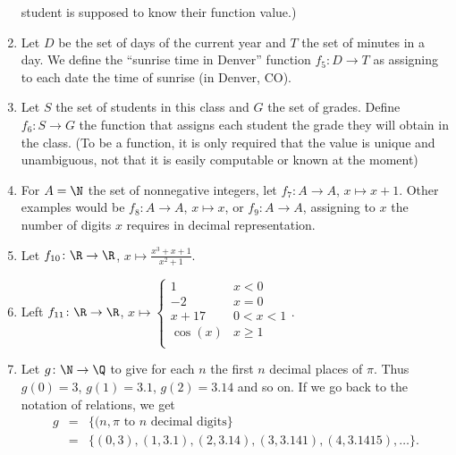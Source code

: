\begin{enumerate}
student is supposed to know their function value.)
\item Let $D$ be the set of days of the current year and $T$ the set of
minutes in a day. We define the ``sunrise time in Denver'' function $f_5\colon
D\to T$ as assigning to each date the time of sunrise (in Denver, CO).
\item Let $S$ the set of students in this class and $G$ the set of grades.
Define $f_6\colon S\to G$ the function that assigns each student the
grade they will obtain in the class.
(To be a function, it is only required that the value is unique and
unambiguous, not that it is easily computable or known at the moment)
\item For $A=\N$ the set of nonnegative integers,
let $f_7\colon A\to A$, $x\mapsto x+1$. Other examples would be
$f_8\colon A\to A$, $x\mapsto x$, or
$f_9\colon A\to A$, assigning to $x$ the number of digits $x$ requires in
decimal representation.
\item Let $f_{10}\colon \R\to\R$, $x\mapsto\frac{x^3+x+1}{x^2+1}$.
\item Left $f_{11}\colon\R\to\R$, $x\mapsto\begin{cases}
1&x<0\\
-2&x=0\\
x+17&0<x<1\\
\cos(x)&x\ge 1\\
\end{cases}$.
\item Let $g\colon\N\to\Q$ to give for each $n$ the first $n$ decimal
places of $\pi$. Thus $g(0)=3$, $g(1)=3.1$, $g(2)=3.14$ and so on. If we go
back to the notation of relations, we get
\begin{eqnarray*}
g&=&\{(n,\mbox{$\pi$ to $n$ decimal digits}\}\\
&=&\{(0,3),(1,3.1),(2,3.14),(3,3.141),(4,3.1415),\ldots\}.
\end{eqnarray*}
\end{enumerate}


